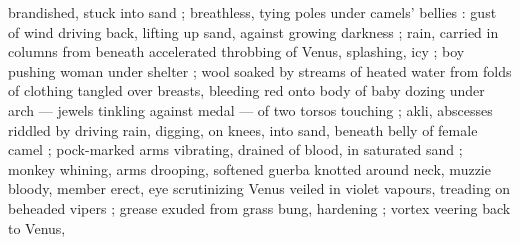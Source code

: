 brandished, stuck into sand ; breathless, tying poles under camels' 
bellies : gust of wind driving back, lifting up sand, against growing 
darkness ; rain, carried in columns from beneath accelerated 
throbbing of Venus, splashing, icy ; boy pushing woman under 
shelter ; wool soaked by streams of heated water from folds of 
clothing tangled over breasts, bleeding red onto body of baby 
dozing under arch --- jewels tinkling against medal --- of two torsos 
touching ; akli, abscesses riddled by driving rain, digging, on knees, 
into sand, beneath belly of female camel ; pock-marked arms 
vibrating, drained of blood, in saturated sand ; monkey whining, 
arms drooping, softened guerba knotted around neck, muzzie 
bloody, member erect, eye scrutinizing Venus veiled in violet 
vapours, treading on beheaded vipers ; grease exuded from grass 
bung, hardening ; vortex veering back to Venus, 

